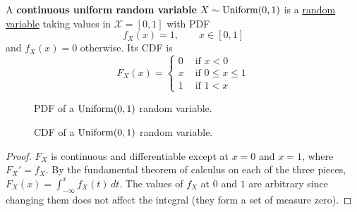   \begin{definition}
    \label{def:uniform-random-variable-2}
    A \textbf{continuous uniform random variable} $X \sim \operatorname{Uniform}(0, 1)$ is a \hyperref[def:continuous-random-variable]{random variable} taking values in $\mathcal{X} = [0, 1]$ with PDF 
    \begin{equation}
      f_X (x) = 1, \qquad x \in [0, 1]
    \end{equation}
    and $f_X (x) = 0$ otherwise. Its CDF is 
    \begin{equation}
      F_X (x) = \begin{cases} 0 & \text{ if } x < 0 \\
      x & \text{ if } 0 \leq x \leq 1 \\
      1 & \text{ if } 1 < x \end{cases}
    \end{equation}
  \begin{center}
    \captionsetup{type=figure}
    \begin{subfigure}[b]{0.48\textwidth}
      \centering
      \caption{PDF of a $\Uniform(0, 1)$ random variable.}
      \label{fig:continuous-uniform-pdf}
    \end{subfigure}
    \hfill 
    \begin{subfigure}[b]{0.48\textwidth}
      \centering
      \caption{CDF of a $\Uniform(0, 1)$ random variable.}
      \label{fig:continuous-uniform-cdf}
    \end{subfigure}
    \caption{The PDF and CDF of a $\Uniform(0, 1)$ random variable.}
    \label{fig:continuous-uniform}
  \end{center}
  \end{definition}
  \begin{proof}
    $F_X$ is continuous and differentiable except at $x = 0$ and $x = 1$, where $F_X' = f_X$. By the fundamental theorem of calculus on each of the three pieces, $F_X (x) = \int_{-\infty}^x f_X (t) \,dt$. The values of $f_X$ at $0$ and $1$ are arbitrary since changing them does not affect the integral (they form a set of measure zero). 
  \end{proof}

